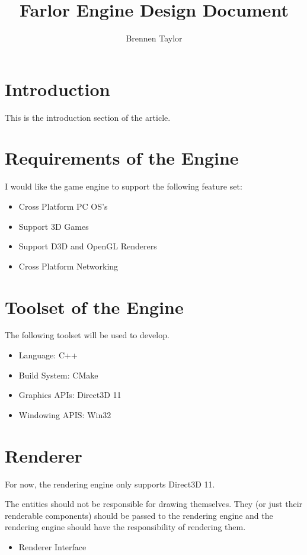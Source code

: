 \documentclass {article}
\title{Farlor Engine Design Document}
\author{Brennen Taylor}
\begin{document}
\maketitle

\section{Introduction}
This is the introduction section of the article.

\section{Requirements of the Engine}
I would like the game engine to support the following feature set:

\begin{itemize}
	\item Cross Platform PC OS's
	\item Support 3D Games
	\item Support D3D and OpenGL Renderers
	\item Cross Platform Networking
\end{itemize}

\section{Toolset of the Engine}
The following toolset will be used to develop.

\begin{itemize}
	\item Language: C++
	\item Build System: CMake
	\item Graphics APIs: Direct3D 11
	\item Windowing APIS: Win32
\end{itemize}

\section{Renderer}
For now, the rendering engine only supports Direct3D 11.

The entities should not be responsible for drawing themselves. They (or just their renderable components) should be passed to the rendering engine and the rendering engine should have the responsibility of rendering them.

\begin{itemize}
	\item Renderer Interface

\end{itemize}
\end{document}
